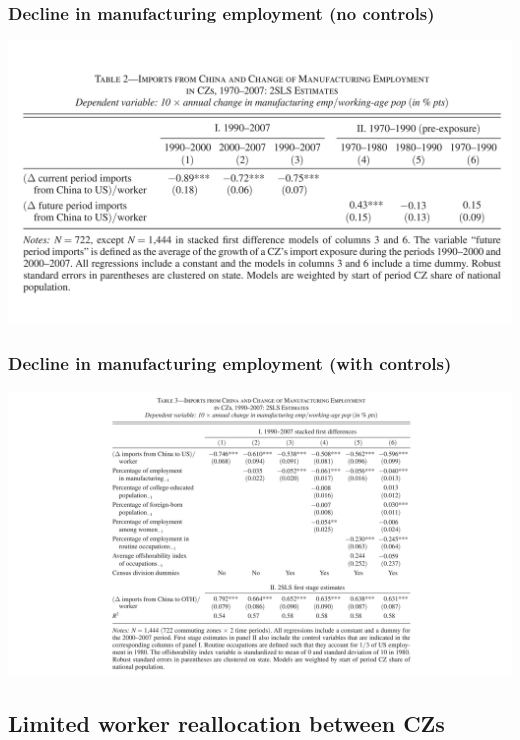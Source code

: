 \documentclass[notes=show]{beamer}
\begin{document}
\begin{frame}
\frametitle{Decline in manufacturing employment (no controls)}
\begin{center}
\includegraphics[width=\textwidth]{table-2.pdf}%
\end{center}
\end{frame}

\begin{frame}
\frametitle{Decline in manufacturing employment (with controls)}
\begin{center}
\includegraphics[width=\textwidth]{table-3.pdf}%
\end{center}
\end{frame}

\subsection{Limited worker reallocation between CZs}
\end{document}
